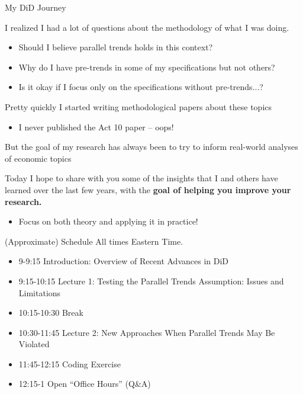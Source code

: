 \documentclass[aspectratio = 169, 12pt]{beamer}
\begin{document}
\begin{frame}{My DiD Journey}
  \begin{wideitemize}
    \item
    I realized I had a lot of questions about the methodology of what I was doing.
    \begin{itemize}
      \item
            Should I believe parallel trends holds in this context?

      \item
            Why do I have pre-trends in some of my specifications but not others?

      \item
            Is it okay if I focus only on the specifications without pre-trends...?
    \end{itemize}

    \pause
    \item Pretty quickly I started writing methodological papers about these topics
    \begin{itemize}
      \item
            I never published the Act 10 paper -- oops!
    \end{itemize}

    \item But the goal of my research has always been to try to inform real-world analyses of economic topics

    \pause
    \item Today I hope to share with you some of the insights that I and others have learned over the last few years, with the \textbf{goal of helping you improve your research.}
    \begin{itemize}
      \item
            Focus on both theory and applying it in practice!
    \end{itemize}

  \end{wideitemize}
\end{frame}


\begin{frame}{(Approximate) Schedule}
All times Eastern Time. \bigskip 
\begin{itemize}
	\item 9-9:15 Introduction: Overview of Recent Advances in DiD 
	\item 9:15-10:15 Lecture 1: Testing the Parallel Trends Assumption: Issues and Limitations
	\item 10:15-10:30 Break
	\item 10:30-11:45 Lecture 2: New Approaches When Parallel Trends May Be Violated
	\item 11:45-12:15 Coding Exercise
	\item 12:15-1 Open ``Office Hours'' (Q\&A)
\end{itemize}
\end{frame}
\end{document}
